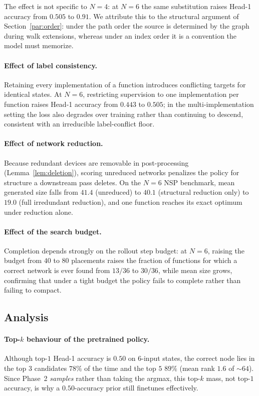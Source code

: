The effect is not specific to $N=4$: at $N=6$ the same substitution raises
Head-1 accuracy from $0.505$ to $0.91$.
We attribute this to the structural argument of Section~\ref{par:order}: under
the path order the source is determined by the graph during walk extensions,
whereas under an index order it is a convention the model must memorize.

\paragraph{Effect of label consistency.}
Retaining every implementation of a function introduces conflicting targets
for identical states.  At $N=6$, restricting supervision to one
implementation per function raises Head-1 accuracy from $0.443$ to $0.505$;
in the multi-implementation setting the loss also degrades over training
rather than continuing to descend, consistent with an irreducible
label-conflict floor.

\paragraph{Effect of network reduction.}
Because redundant devices are removable in post-processing
(Lemma~\ref{lem:deletion}), scoring unreduced networks penalizes the policy
for structure a downstream pass deletes.  On the $N=6$ NSP benchmark, mean
generated size falls from $41.4$ (unreduced) to $40.1$ (structural reduction
only) to $19.0$ (full irredundant reduction), and one function reaches its
exact optimum under reduction alone.

\paragraph{Effect of the search budget.}
Completion depends strongly on the rollout step budget: at $N=6$, raising the
budget from $40$ to $80$ placements raises the fraction of functions for
which a correct network is ever found from $13/36$ to $30/36$, while mean size
grows, confirming that under a tight budget the policy fails to complete
rather than failing to compact.


\subsection{Analysis}
\label{sec:analysis}

\paragraph{Top-$k$ behaviour of the pretrained policy.}
Although top-$1$ Head-1 accuracy is $0.50$ on $6$-input states, the correct
node lies in the top $3$ candidates $78\%$ of the time and the top $5$ $89\%$
(mean rank $1.6$ of ${\sim}64$).  Since Phase~2 \emph{samples} rather than
taking the argmax, this top-$k$ mass, not top-$1$ accuracy, is why a
$0.50$-accuracy prior still finetunes effectively.

